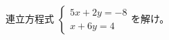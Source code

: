 \documentclass[../../../../hsm_tok_q.tex]{subfiles}
\begin{document}
    連立方程式 \;$\begin{cases} 5x + 2y = -8 \\ x + 6y = 4 \end{cases}$を解け。
\end{document}
